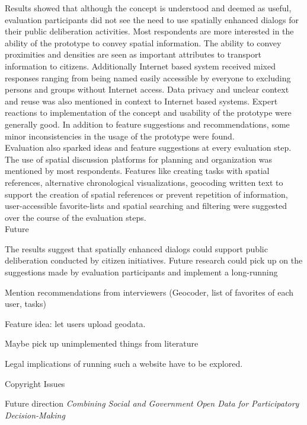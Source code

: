 Results showed that although the concept is understood and deemed as useful, evaluation participants did not see the need to use spatially enhanced dialogs for their public deliberation activities. Most respondents are more interested in the ability of the prototype to convey spatial information. The ability to convey proximities and densities are seen as important attributes to transport information to citizens. Additionally Internet based system received mixed responses ranging from being named easily accessible by everyone to excluding persons and groups without Internet access. Data privacy and unclear context and reuse was also mentioned in context to Internet based systems. Expert reactions to implementation of the concept and usability of the prototype were generally good. In addition to feature suggestions and recommendations, some minor inconsistencies in the usage of the prototype were found.\\
Evaluation also sparked ideas and feature suggestions at every evaluation step. The use of spatial discussion platforms for planning and organization was mentioned by most respondents. Features like creating tasks with spatial references, alternative chronological visualizations, geocoding written text to support the creation of spatial references or prevent repetition of information, user-accessible favorite-lists and spatial searching and filtering were suggested over the course of the evaluation steps.\\
Future


The results suggest that spatially enhanced dialogs could support public deliberation conducted by citizen initiatives. Future research could pick up on the suggestions made by evaluation participants and implement a long-running 


Mention recommendations from interviewers (Geocoder, list of favorites of each user, tasks)

Feature idea: let users upload geodata.

Maybe pick up unimplemented things from literature

Legal implications of running such a website have to be explored.

Copyright Issues \cite{Carver2001_PPGIS_Cyberdemocracy}


Future direction \textit{Combining Social and Government Open Data for Participatory Decision-Making}